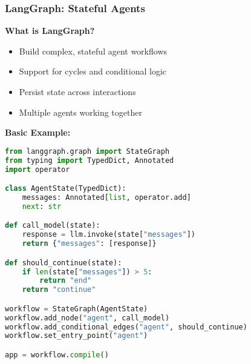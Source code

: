 \begin{frame}[fragile]\frametitle{LangGraph: Stateful Agents}

\textbf{What is LangGraph?}
\begin{itemize}
\item Build complex, stateful agent workflows
\item Support for cycles and conditional logic
\item Persist state across interactions
\item Multiple agents working together
\end{itemize}

\textbf{Basic Example:}
\begin{lstlisting}[language=python, basicstyle=\tiny]
from langgraph.graph import StateGraph
from typing import TypedDict, Annotated
import operator

class AgentState(TypedDict):
    messages: Annotated[list, operator.add]
    next: str

def call_model(state):
    response = llm.invoke(state["messages"])
    return {"messages": [response]}

def should_continue(state):
    if len(state["messages"]) > 5:
        return "end"
    return "continue"

workflow = StateGraph(AgentState)
workflow.add_node("agent", call_model)
workflow.add_conditional_edges("agent", should_continue)
workflow.set_entry_point("agent")

app = workflow.compile()
\end{lstlisting}

\end{frame}

